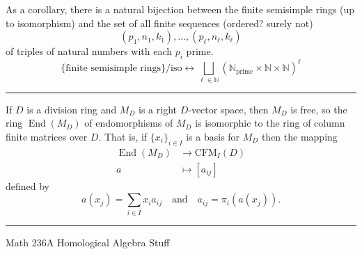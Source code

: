 \documentclass[12pt]{article}
\newcommand{\sepline}{\rule{\textwidth}{0.4pt}}
\theoremstyle{definition}
\newcommand{\isp}[1]{\quad\text{#1}\quad}
\newcommand{\N}{\mathbb{N}}
\newcommand{\<}{\left\langle}
\renewcommand{\>}{\right\rangle}
\newcommand{\To}{\longrightarrow}
\newcommand{\Mapsto}{\longmapsto}
\DeclareMathOperator{\End}{End}
\renewcommand{\_}[1]{{_{#1}}}
\begin{document}
As a corollary, there is a natural bijection between the finite semisimple rings (up to isomorphism) and the set of all finite sequences (ordered? surely not)
\[
    (p_1, n_1, k_1), \dots, (p_\ell, n_\ell, k_\ell)
\]
of triples of natural numbers with each $p_i$ prime.
\[
    \{\text{finite semisimple rings}\}/\text{iso} \longleftrightarrow \bigsqcup_{\ell \in \N} (\N_{\mathrm{prime}} \times \N \times \N)^\ell
\]

\sepline

If $D$ is a division ring and $M_D$ is a right $D$-vector space, then $M_D$ is free, so the ring $\End(M_D)$ of endomorphisms of $M_D$ is isomorphic to the ring of column finite matrices over $D$.
That is, if $\{x_i\}_{i \in I}$ is a basis for $M_D$ then the mapping
\begin{align*}
    \End(M_D) &\To \mathrm{CFM}_I(D) \\
    a &\Mapsto [a_{ij}]
\end{align*}
defined by
\[
    a(x_j) = \sum_{i \in I} x_i a_{ij} \isp{and} a_{ij} = \pi_i(a(x_j)).
\]




\newpage
\sepline

Math 236A Homological Algebra Stuff
\end{document}
